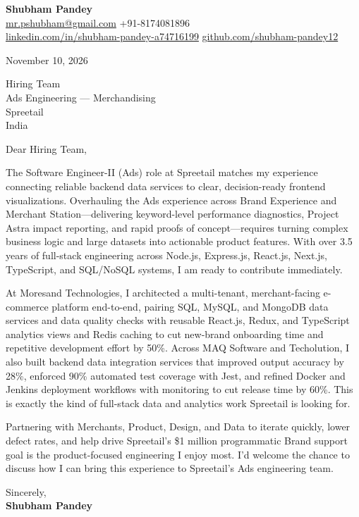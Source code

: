 \documentclass[a4paper,11pt]{article}
\begin{document}
\textbf{\Large Shubham Pandey}\\
\href{mailto:mr.pshubham@gmail.com}{mr.pshubham@gmail.com} \quad +91-8174081896\\
\href{https://www.linkedin.com/in/shubham-pandey-a74716199/}{linkedin.com/in/shubham-pandey-a74716199} \quad
\href{https://github.com/shubham-pandey12}{github.com/shubham-pandey12}

\vspace{1em}
November 10, 2026

\vspace{1em}
Hiring Team\\
Ads Engineering --- Merchandising\\
Spreetail\\
India

\vspace{1em}
Dear Hiring Team,

The Software Engineer-II (Ads) role at Spreetail matches my experience connecting reliable backend data services to clear, decision-ready frontend visualizations. Overhauling the Ads experience across Brand Experience and Merchant Station---delivering keyword-level performance diagnostics, Project Astra impact reporting, and rapid proofs of concept---requires turning complex business logic and large datasets into actionable product features. With over 3.5 years of full-stack engineering across Node.js, Express.js, React.js, Next.js, TypeScript, and SQL/NoSQL systems, I am ready to contribute immediately.

At Moresand Technologies, I architected a multi-tenant, merchant-facing e-commerce platform end-to-end, pairing SQL, MySQL, and MongoDB data services and data quality checks with reusable React.js, Redux, and TypeScript analytics views and Redis caching to cut new-brand onboarding time and repetitive development effort by 50\%. Across MAQ Software and Techolution, I also built backend data integration services that improved output accuracy by 28\%, enforced 90\% automated test coverage with Jest, and refined Docker and Jenkins deployment workflows with monitoring to cut release time by 60\%. This is exactly the kind of full-stack data and analytics work Spreetail is looking for.

Partnering with Merchants, Product, Design, and Data to iterate quickly, lower defect rates, and help drive Spreetail's \$1 million programmatic Brand support goal is the product-focused engineering I enjoy most. I'd welcome the chance to discuss how I can bring this experience to Spreetail's Ads engineering team.

\vspace{1em}
Sincerely,\\[0.5em]
\textbf{Shubham Pandey}
\end{document}
